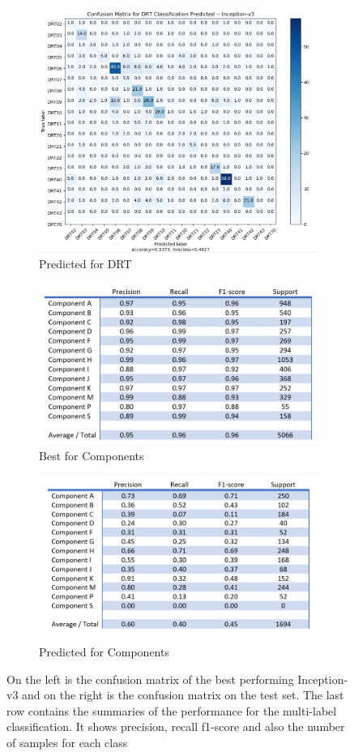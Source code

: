 \begin{figure}
\begin{subfigure}{.5\textwidth}
  \includegraphics[width=.8\linewidth]{figures/04-go_drt_pred.PNG}
  \caption{Predicted for DRT}
  \label{fig:googcmpred_drt}
\end{subfigure}
\begin{subfigure}{.5\textwidth}
  \centering
  \includegraphics[width=.8\linewidth]{figures/04-go_compo_best.PNG}
  \caption{Best for Components}
  \label{fig:googcm_comp}
\end{subfigure}%
\begin{subfigure}{.5\textwidth}
  \centering
  \includegraphics[width=.8\linewidth]{figures/04-go_compo_pred.PNG}
  \caption{Predicted for Components}
  \label{fig:googcmpred_comp}
\end{subfigure}
\caption[Confusion matrices of classes trained on Inception-v3]{On the left is the confusion matrix of the best performing Inception-v3 and on the right is the confusion matrix on the test set. The last row contains the summaries of the performance for the multi-label classification. It shows precision, recall f1-score and also the number of samples for each class}
\label{fig:googcm}
\end{figure}


